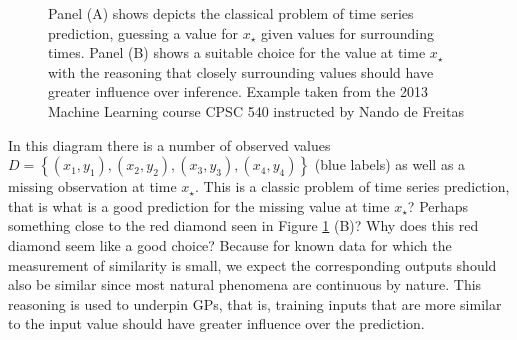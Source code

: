 \begin{figure}[h]
{\begin{adjustbox}{width=0.48\textwidth}
        \end{adjustbox}
    }
    \caption{Panel (A) shows depicts the classical problem of time series prediction, guessing a value for $x_{\star}$ given values for surrounding times. Panel (B) shows a suitable choice for the value at time $x_{\star}$ with the reasoning that closely surrounding values should have greater influence over inference. Example taken from the 2013 Machine Learning course CPSC 540 instructed by Nando de Freitas \cite{Nando2013}}
    \label{fig: motive_gp_1}
\end{figure}

In this diagram there is a number of observed values $D = \left\{ (x_1,y_1), (x_2,y_2), (x_3,y_3), (x_4,y_4) \right\}$ (blue labels) as well as a missing observation at time $x_{\star}$. This is a classic problem of time series prediction, that is what is a good prediction for the missing value at time $x_{\star}$? Perhaps something close to the red diamond seen in Figure \ref{fig: motive_gp_1} (B)? Why does this red diamond seem like a good choice? Because for known data for which the measurement of similarity is small, we expect the corresponding outputs should also be similar since most natural phenomena are continuous by nature. This reasoning is used to underpin GPs, that is, training inputs that are more similar to the input value should have greater influence over the prediction.

